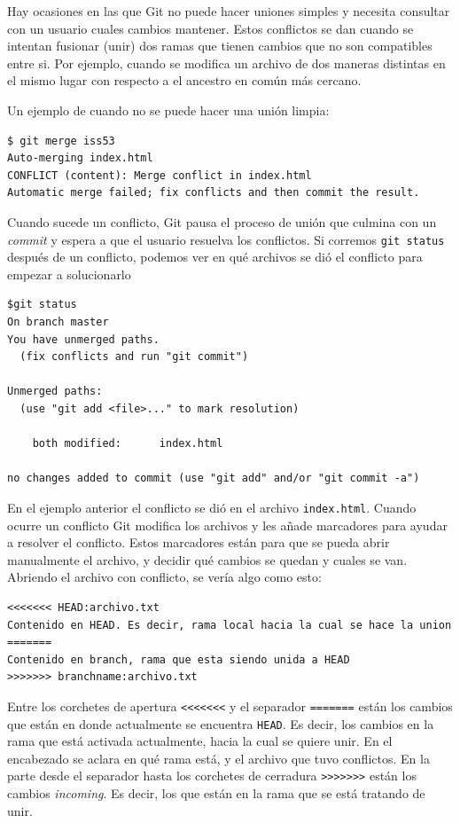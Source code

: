 \documentclass[spanish, 12pt, a4paper]{article}
\begin{document}
Hay ocasiones en las que Git no puede hacer uniones simples y necesita
consultar con un usuario cuales cambios mantener. Estos conflictos se
dan cuando se intentan fusionar (unir) dos ramas que tienen cambios que
no son compatibles entre si. Por ejemplo, cuando se modifica un archivo
de dos maneras distintas en el mismo lugar con respecto a el ancestro en
común más cercano.

Un ejemplo de cuando no se puede hacer una unión limpia:

\begin{lstlisting}
$ git merge iss53
Auto-merging index.html
CONFLICT (content): Merge conflict in index.html
Automatic merge failed; fix conflicts and then commit the result.
\end{lstlisting}

Cuando sucede un conflicto, Git pausa el proceso de unión que culmina
con un \emph{commit} y espera a que el usuario resuelva los conflictos.
Si corremos \passthrough{\lstinline!git status!} después de un
conflicto, podemos ver en qué archivos se dió el conflicto para empezar
a solucionarlo

\begin{lstlisting}
$git status
On branch master
You have unmerged paths.
  (fix conflicts and run "git commit")

Unmerged paths:
  (use "git add <file>..." to mark resolution)

    both modified:      index.html

no changes added to commit (use "git add" and/or "git commit -a")
\end{lstlisting}

En el ejemplo anterior el conflicto se dió en el archivo
\passthrough{\lstinline!index.html!}. Cuando ocurre un conflicto Git
modifica los archivos y les añade marcadores para ayudar a resolver el
conflicto. Estos marcadores están para que se pueda abrir manualmente el
archivo, y decidir qué cambios se quedan y cuales se van. Abriendo el
archivo con conflicto, se vería algo como esto:

\begin{lstlisting}
<<<<<<< HEAD:archivo.txt
Contenido en HEAD. Es decir, rama local hacia la cual se hace la union
=======
Contenido en branch, rama que esta siendo unida a HEAD
>>>>>>> branchname:archivo.txt
\end{lstlisting}

Entre los corchetes de apertura \passthrough{\lstinline!<<<<<<<!} y el
separador \passthrough{\lstinline!=======!} están los cambios que están
en donde actualmente se encuentra \passthrough{\lstinline!HEAD!}. Es
decir, los cambios en la rama que está activada actualmente, hacia la
cual se quiere unir. En el encabezado se aclara en qué rama está, y el
archivo que tuvo conflictos. En la parte desde el separador hasta los
corchetes de cerradura \passthrough{\lstinline!>>>>>>>!} están los
cambios \emph{incoming}. Es decir, los que están en la rama que se está
tratando de unir.
\end{document}
